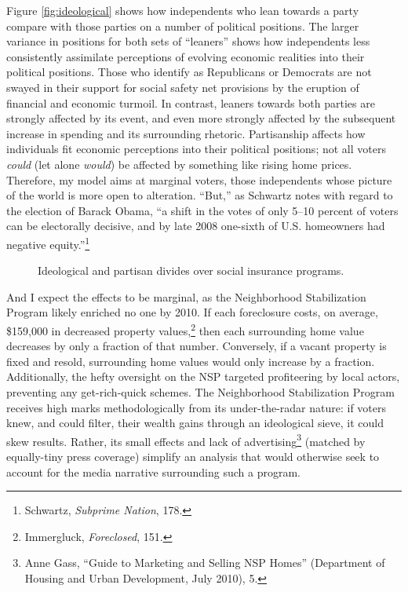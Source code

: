 \documentclass[12pt,oneside]{psthesis}
\begin{document}
Figure \ref{fig:ideological} shows how independents who lean towards a party compare with those parties on a number of political positions.
The larger variance in positions for both sets of ``leaners'' shows how independents less consistently assimilate perceptions of evolving economic realities into their political positions.
Those who identify as Republicans or Democrats are not swayed in their support for social safety net provisions by the eruption of financial and economic turmoil.
In contrast, leaners towards both parties are strongly affected by its event, and even more strongly affected by the subsequent increase in spending and its surrounding rhetoric.
Partisanship affects how individuals fit economic perceptions into their political positions; not all voters \emph{could} (let alone \emph{would}) be affected by something like rising home prices.
Therefore, my model aims at marginal voters, those independents whose picture of the world is more open to alteration.
``But,'' as Schwartz notes with regard to the election of Barack Obama, ``a shift in the votes of only 5--10 percent of voters can be electorally decisive, and by late 2008 one-sixth of U.S. homeowners had negative equity.''\footnote{Schwartz, \emph{Subprime Nation}, 178.}
\begin{figure}

{\centering {}

}

\caption{Ideological and partisan divides over social insurance programs.}\label{fig:ideological-social}
\end{figure}
And I expect the effects to be marginal, as the Neighborhood Stabilization Program likely enriched no one by 2010.
If each foreclosure costs, on average, \$159,000 in decreased property values,\footnote{Immergluck, \emph{Foreclosed}, 151.} then each surrounding home value decreases by only a fraction of that number.
Conversely, if a vacant property is fixed and resold, surrounding home values would only increase by a fraction.
Additionally, the hefty oversight on the NSP targeted profiteering by local actors, preventing any get-rich-quick schemes.
The Neighborhood Stabilization Program receives high marks methodologically from its under-the-radar nature: if voters knew, and could filter, their wealth gains through an ideological sieve, it could skew results.
Rather, its small effects and lack of advertising\footnote{Anne Gass, ``Guide to Marketing and Selling NSP Homes'' (Department of Housing and Urban Development, July 2010), 5.} (matched by equally-tiny press coverage) simplify an analysis that would otherwise seek to account for the media narrative surrounding such a program.
\end{document}
